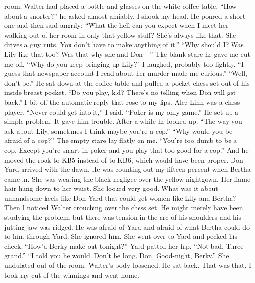 \documentclass{novel}
\begin{document}
room. Walter had placed a bottle and glasses on the white coffee table. “How about a snorter?” he asked almost amiably. I shook my head. He poured a short one and then said angrily: “What the hell can you expect when I meet her walking out of her room in only that yellow stuff? She’s always like that. She drives a guy nuts. You don’t have to make anything of it.” “Why should I? Was Lily like that too? Was that why she and Don—” The blank stare he gave me cut me off. “Why do you keep bringing up Lily?” I laughed, probably too lightly. “I guess that newspaper account I read about her murder made me curious.” “Well, don’t be.” He sat down at the coffee table and pulled a pocket chess set out of his inside breast pocket. “Do you play, kid? There’s no telling when Don will get back.” I bit off the automatic reply that rose to my lips. Alec Linn was a chess player. “Never could get into it,” I said. “Poker is my only game.” He set up a simple problem. It gave him trouble. After a while he looked up. “The way you ask about Lily, sometimes I think maybe you’re a cop.” “Why would you be afraid of a cop?” The empty stare lay flatly on me. “You’re too dumb to be a cop. Except you’re smart in poker and you play that too good for a cop.” And he moved the rook to KB5 instead of to KB6, which would have been proper. Don Yard arrived with the dawn. He was counting out my fifteen percent when Bertha came in. She was wearing the black negligee over the yellow nightgown. Her flame hair hung down to her waist. She looked very good. What was it about unhandsome heels like Don Yard that could get women like Lily and Bertha? Then I noticed Walter crouching over the chess set. He might merely have been studying the problem, but there was tension in the arc of his shoulders and his jutting jaw was ridged. He was afraid of Yard and afraid of what Bertha could do to him through Yard. She ignored him. She went over to Yard and pecked his cheek. “How’d Berky make out tonight?” Yard patted her hip. “Not bad. Three grand.” “I told you he would. Don’t be long, Don. Good-night, Berky.” She undulated out of the room. Walter’s body loosened. He sat back. That was that. I took my cut of the winnings and went home.


\begin{ChapterStart}

\vspace{3\nbs}
\end{ChapterStart}

\end{document}
